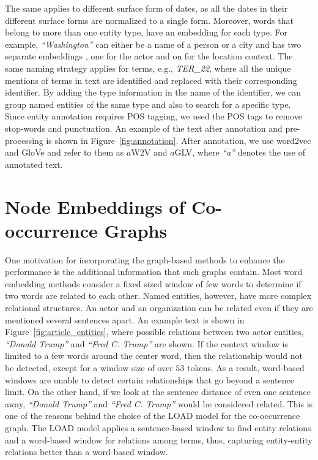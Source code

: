 The same applies to different surface form of dates, as all the dates in their different surface forms  are normalized to a single form. Moreover, words that belong to more than one entity type, have an embedding for each type. For example, \emph{``Washington''} can either be a name of a person or a city and has two separate embeddings , one for the actor and on for the location context. The same naming strategy applies for terms, e.g., \emph{TER\_22}, where all the unique mentions of terms in text are identified and replaced with their corresponding identifier. By adding the type information in the name of the identifier, we can group named entities of the same type and also to search for a specific type. \\
Since entity annotation requires POS tagging, we used the POS tags to remove stop-words and punctuation. An example of the text after annotation and pre-processing is shown in Figure~\ref{fig:annotation}. After annotation, we use word2vec and GloVe and refer to them as $a$W2V and $a$GLV, where \emph{``a''} denotes the use of annotated text. 

\section{Node Embeddings of Co-occurrence Graphs}\label{sec:graph_based}

One motivation for incorporating the graph-based methods to enhance the performance is the additional information that such graphs contain. Most word embedding methods consider a fixed sized window of few words to determine if two words are related to each other. Named entities, however, have more complex relational structures. An actor and an organization can be related even if they are mentioned several sentences apart. An example text is shown in Figure~\ref{fig:article_entities}, where possible relations between two actor entities, \emph{``Donald Trump''} and \emph{``Fred C. Trump''} are shown. If the context window is limited to a few words around the center word, then the relationship would not be detected, except for a window size of over $53$ tokens. As a result, word-based windows are unable to detect certain relationships that go beyond a sentence limit. 
On the other hand, if we look at the sentence distance of even one sentence away, \emph{``Donald Trump''} and \emph{``Fred C. Trump''} would be considered related. This is one of the reasons behind the choice of the LOAD model for the co-occurrence graph. The LOAD model applies a sentence-based window to find entity relations and a word-based window for relations among terms, thus, capturing entity-entity relations better than a word-based window.

